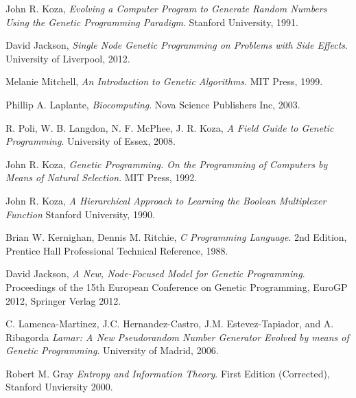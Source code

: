 \documentclass[a4paper,10.5pt]{article}
\begin{document}
\begin{thebibliography}{10}

  John R. Koza, 
  \emph{Evolving a Computer Program to Generate Random Numbers Using the Genetic Programming Paradigm}. 
  Stanford University, 
  1991.

  David Jackson,
  \emph{Single Node Genetic Programming on Problems with Side Effects}.
  University of Liverpool,
  2012.

  Melanie Mitchell,
  \emph{An Introduction to Genetic Algorithms}.
  MIT Press,
  1999.

  Phillip A. Laplante,
  \emph{Biocomputing}.
  Nova Science Publishers Inc,
  2003.

  R. Poli, W. B. Langdon, N. F. McPhee, J. R. Koza, 
  \emph{A Field Guide to Genetic Programming}. 
  University of Essex, 
  2008.

  John R. Koza, 
  \emph{Genetic Programming. On the Programming of Computers by Means of Natural Selection}. 
  MIT Press, 
  1992.

  John R. Koza,
  \emph{A Hierarchical Approach to Learning the Boolean Multiplexer Function}
  Stanford University,
  1990.

  Brian W. Kernighan, Dennis M. Ritchie, 
  \emph{C Programming Language}.
  2nd Edition, 
  Prentice Hall Professional Technical Reference, 
  1988.

  David Jackson,
  \emph{A New, Node-Focused Model for Genetic Programming}.
  Proceedings of the 15th European Conference on Genetic Programming, EuroGP 2012, 
  Springer Verlag
  2012.

  C. Lamenca-Martinez, J.C. Hernandez-Castro,
  J.M. Estevez-Tapiador, and A. Ribagorda
  \emph{Lamar: A New Pseudorandom Number Generator Evolved by means of Genetic Programming}.
  University of Madrid,
  2006.

  Robert M. Gray
  \emph{Entropy and Information Theory}.
  First Edition (Corrected),
  Stanford Unviersity
  2000.

\end{thebibliography}
\end{document}
